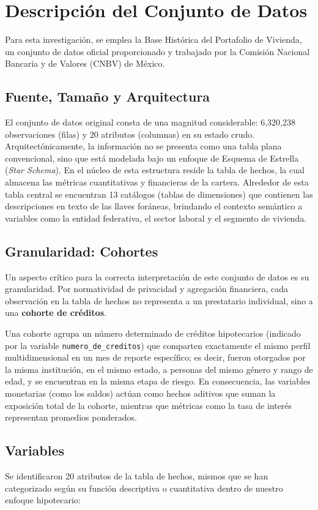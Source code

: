 \section{Descripción del Conjunto de Datos}

Para esta investigación, se emplea la Base Histórica del Portafolio de Vivienda, un conjunto de datos oficial proporcionado y trabajado por la Comisión Nacional Bancaria y de Valores (CNBV) de México. 

\subsection{Fuente, Tamaño y Arquitectura}
El conjunto de datos original consta de una magnitud considerable: 6,320,238 observaciones (filas) y 20 atributos (columnas) en su estado crudo. Arquitectónicamente, la información no se presenta como una tabla plana convencional, sino que está modelada bajo un enfoque de Esquema de Estrella (\textit{Star Schema}). En el núcleo de esta estructura reside la tabla de hechos, la cual almacena las métricas cuantitativas y financieras de la cartera. Alrededor de esta tabla central se encuentran 13 catálogos (tablas de dimensiones) que contienen las descripciones en texto de las llaves foráneas, brindando el contexto semántico a variables como la entidad federativa, el sector laboral y el segmento de vivienda.

\subsection{Granularidad: Cohortes}
Un aspecto crítico para la correcta interpretación de este conjunto de datos es su granularidad. Por normatividad de privacidad y agregación financiera, cada observación en la tabla de hechos no representa a un prestatario individual, sino a una \textbf{cohorte de créditos}. 

Una cohorte agrupa un número determinado de créditos hipotecarios (indicado por la variable \texttt{numero\_de\_creditos}) que comparten exactamente el mismo perfil multidimensional en un mes de reporte específico; es decir, fueron otorgados por la misma institución, en el mismo estado, a personas del mismo género y rango de edad, y se encuentran en la misma etapa de riesgo. En consecuencia, las variables monetarias (como los saldos) actúan como hechos aditivos que suman la exposición total de la cohorte, mientras que métricas como la tasa de interés representan promedios ponderados.

\subsection{Variables}
Se identificaron 20 atributos de la tabla de hechos, mismos que se han categorizado según su función descriptiva o cuantitativa dentro de nuestro enfoque hipotecario:

